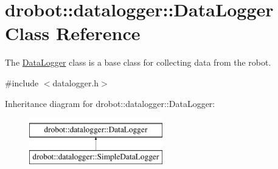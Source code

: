 \hypertarget{classdrobot_1_1datalogger_1_1DataLogger}{\section{drobot\-:\-:datalogger\-:\-:Data\-Logger Class Reference}
\label{classdrobot_1_1datalogger_1_1DataLogger}
}


The \hyperlink{classdrobot_1_1datalogger_1_1DataLogger}{Data\-Logger} class is a base class for collecting data from the robot.  




{\ttfamily \#include $<$datalogger.\-h$>$}

Inheritance diagram for drobot\-:\-:datalogger\-:\-:Data\-Logger\-:\begin{figure}[H]
\begin{center}
\leavevmode
\includegraphics[height=2.000000cm]{classdrobot_1_1datalogger_1_1DataLogger}
\end{center}
\end{figure}
